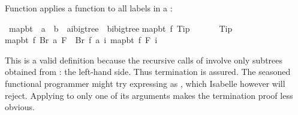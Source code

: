 \begin{isabellebody}
\begin{isamarkuptext}
Function  applies a function to all labels in a :%
\end{isamarkuptext}%
\isamarkuptrue%
\ map{\isacharunderscore}bt\ {\isacharcolon}{\isacharcolon}\ {\isachardoublequote}{\isacharparenleft}{\isacharprime}a\ {\isasymRightarrow}\ {\isacharprime}b{\isacharparenright}\ {\isasymRightarrow}\ {\isacharparenleft}{\isacharprime}a{\isacharcomma}{\isacharprime}i{\isacharparenright}bigtree\ {\isasymRightarrow}\ {\isacharparenleft}{\isacharprime}b{\isacharcomma}{\isacharprime}i{\isacharparenright}bigtree{\isachardoublequote}\isanewline
\isamarkupfalse%
\isanewline
{\isachardoublequote}map{\isacharunderscore}bt\ f\ Tip\ \ \ \ \ \ {\isacharequal}\ Tip{\isachardoublequote}\isanewline
{\isachardoublequote}map{\isacharunderscore}bt\ f\ {\isacharparenleft}Br\ a\ F{\isacharparenright}\ {\isacharequal}\ Br\ {\isacharparenleft}f\ a{\isacharparenright}\ {\isacharparenleft}{\isasymlambda}i{\isachardot}\ map{\isacharunderscore}bt\ f\ {\isacharparenleft}F\ i{\isacharparenright}{\isacharparenright}{\isachardoublequote}\isamarkupfalse%
%
\begin{isamarkuptext}%
\noindent This is a valid  definition because the
recursive calls of  involve only subtrees obtained from
: the left-hand side. Thus termination is assured.  The
seasoned functional programmer might try expressing
 as , which Isabelle 
however will reject.  Applying  to only one of its arguments
makes the termination proof less obvious.


\end{isamarkuptext}
\end{isabellebody}
